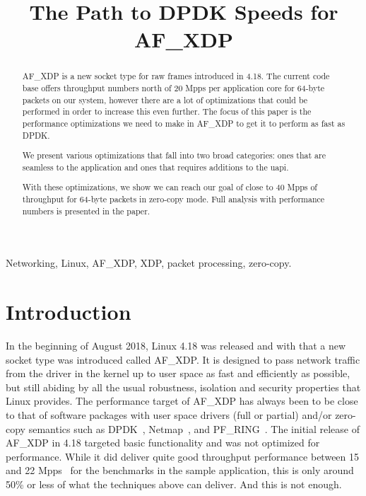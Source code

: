 \documentclass[9pt,numbers,reprint]{sigplanconf}
\title{The Path to DPDK Speeds for AF\_XDP}
\begin{document}
\makeatletter
\def\@copyrightspace{\relax}
\makeatother

\maketitle

\begin{abstract}
AF\_XDP is a new socket type for raw frames introduced in 4.18. The
current code base offers throughput numbers north of 20 Mpps per
application core for 64-byte packets on our system, however there are
a lot of optimizations that could be performed in order to increase
this even further. The focus of this paper is the performance
optimizations we need to make in AF\_XDP to get it to perform as fast
as DPDK.

We present various optimizations that fall into two broad categories:
ones that are seamless to the application and ones that requires
additions to the uapi.

With these optimizations, we show we can reach our goal of close to 40
Mpps of throughput for 64-byte packets in zero-copy mode. Full
analysis with performance numbers is presented in the paper.
\end{abstract}

\keywords
Networking, Linux, AF\_XDP, XDP, packet processing, zero-copy.

\section{Introduction}
In the beginning of August 2018, Linux 4.18 was released and with that
a new socket type was introduced called AF\_XDP. It is designed to
pass network traffic from the driver in the kernel up to user space as
fast and efficiently as possible, but still abiding by all the usual
robustness, isolation and security properties that Linux provides. The
performance target of AF\_XDP has always been to be close to that of
software packages with user space drivers (full or partial) and/or
zero-copy semantics such as DPDK~\cite{dpdk}, Netmap~\cite{netmap},
and PF\_RING~\cite{pfring}. The initial release of AF\_XDP in 4.18
targeted basic functionality and was not optimized for
performance. While it did deliver quite good throughput performance
between 15 and 22 Mpps~\cite{af_xdp_patch, af_xdp_patch_zc,
  af_xdp_patch_i40e, af_xdp_lwn} for the benchmarks in the sample
application, this is only around 50\% or less of what the techniques
above can deliver. And this is not enough.
\end{document}
